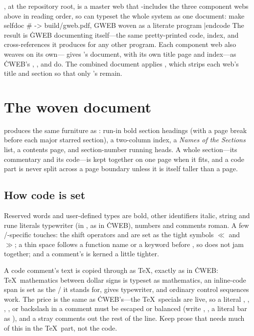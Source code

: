 , at the repository root, is a master web that -includes the
three component webs above in reading order, so  can typeset the
whole system as one document:
\begincode
make selfdoc      # -> build/gweb.pdf, GWEB woven as a literate program
|endcode
\noindent The result is \.{GWEB} documenting itself---the same pretty-printed
code, index, and cross-references it produces for any other program. Each
component web also weaves on its own--- gives
's document, with its own title page and index---as \.{CWEB}'s
, , and  do. The combined document
applies , which strips each web's title and  section
so that only 's remain.

\chapter{The woven document}
\noindent
{} produces the same furniture as : run-in bold section
headings (with a page break before each major starred section), a two-column
index, a {\it Names of the Sections\/} list, a contents page, and section-number
running heads. A whole section---its commentary and its code---is kept
together on one page when it fits, and a code part is never split across a page
boundary unless it is itself taller than a page.

\section{How code is set}
Reserved words and user-defined types are bold, other identifiers italic, string
and rune literals typewriter (in , as in \.{CWEB}), numbers and comments
roman. A few \GO/-specific touches: the shift operators \cw{<<} and \cw{>>} are set
as the tight symbols $\ll$ and $\gg$; a thin space follows a function name or a
keyword before \cw{(}, so  does not jam together; and a comment's
\cw{//} is kerned a little tighter.

A code comment's text is copied through as \TeX, exactly as in \.{CWEB}: \TeX\
mathematics between dollar signs is typeset as mathematics, an inline-code span
\cw{|...|} is set as the \GO/ it stands for, \cw{\bs.\char123...\char125} gives
typewriter, and ordinary control sequences work. The price is the same as
\.{CWEB}'s---the \TeX\ specials are live, so a literal \cw{\char123}, \cw{\$},
\cw{\%}, \cw{\char38}, or backslash in a comment must be escaped or balanced (write
\cw{\bs\char123}, \cw{\bs\$}, a literal bar as \cw{\bs\char124}), and a stray
\cw{\%} comments out the rest of the line. Keep prose that needs much of this in
the \TeX\ part, not the code.

